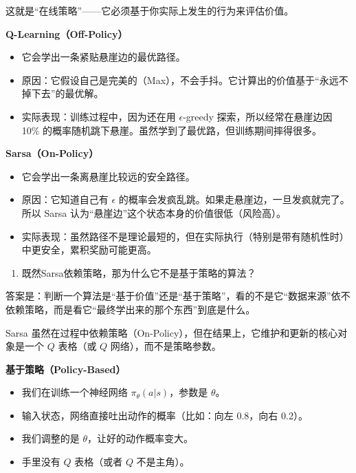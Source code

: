 这就是``在线策略''------它必须基于你实际上发生的行为来评估价值。

\textbf{Q-Learning（Off-Policy）}

\begin{itemize}
\tightlist
\item
  它会学出一条紧贴悬崖边的最优路径。
\item
  原因：它假设自己是完美的（Max），不会手抖。它计算出的价值基于``永远不掉下去''的最优解。
\item
  实际表现：训练过程中，因为还在用 \(\epsilon\)-greedy 探索，所以经常在悬崖边因 10\% 的概率随机跳下悬崖。虽然学到了最优路，但训练期间摔得很多。
\end{itemize}

\textbf{Sarsa（On-Policy）}

\begin{itemize}
\tightlist
\item
  它会学出一条离悬崖比较远的安全路径。
\item
  原因：它知道自己有 \(\epsilon\) 的概率会发疯乱跳。如果走悬崖边，一旦发疯就完了。所以 Sarsa 认为``悬崖边''这个状态本身的价值很低（风险高）。
\item
  实际表现：虽然路径不是理论最短的，但在实际执行（特别是带有随机性时）中更安全，累积奖励可能更高。
\end{itemize}

\begin{enumerate}
\def\labelenumi{\arabic{enumi}.}
\setcounter{enumi}{3}
\tightlist
\item
  既然Sarsa依赖策略，那为什么它不是基于策略的算法？
\end{enumerate}

答案是：判断一个算法是``基于价值''还是``基于策略''，看的不是它``数据来源''依不依赖策略，而是看它``最终学出来的那个东西''到底是什么。

Sarsa 虽然在过程中依赖策略（On-Policy），但在结果上，它维护和更新的核心对象是一个 \(Q\) 表格（或 \(Q\) 网络），而不是策略参数。

\textbf{基于策略（Policy-Based）}

\begin{itemize}
\tightlist
\item
  我们在训练一个神经网络 \(\pi_\theta(a|s)\)，参数是 \(\theta\)。
\item
  输入状态，网络直接吐出动作的概率（比如：向左 0.8，向右 0.2）。
\item
  我们调整的是 \(\theta\)，让好的动作概率变大。
\item
  手里没有 \(Q\) 表格（或者 \(Q\) 不是主角）。
\end{itemize}

